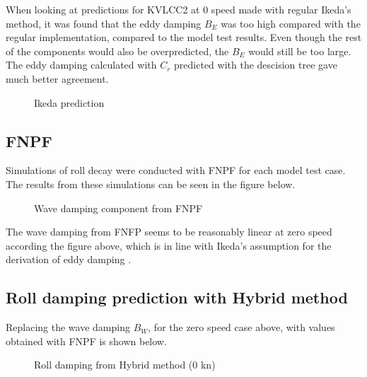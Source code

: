     When looking at predictions for KVLCC2 at 0 speed made with regular
Ikeda's method, it was found that the eddy damping $B_E$ was too high
compared with the regular implementation, compared to the model test
results. Even though the rest of the components would also be
overpredicted, the $B_E$ would still be too large. The eddy damping
calculated with $C_r$ predicted with the descision tree gave much
better agreement.

    \begin{figure}
        \begin{center}\end{center}
        \caption{Ikeda prediction}
        \label{fig:ikeda}
    \end{figure}
    
    \subsection{FNPF}\label{fnpf}

Simulations of roll decay were conducted with FNPF for each model test
case. The results from these simulations can be seen in the figure
below.

    \begin{figure}
        \begin{center}\end{center}
        \caption{Wave damping component from FNPF}
        \label{fig:fnpf}
    \end{figure}
    
    The wave damping from FNFP seems to be reasonably linear at zero speed
according the figure above, which is in line with Ikeda's assumption for
the derivation of eddy damping \cite{7505983/4AFVVGNT}.

    \subsection{Roll damping prediction with Hybrid
method}\label{roll-damping-prediction-with-hybrid-method}
Replacing the wave damping $B_W$, for the zero speed case above, with values obtained with FNPF is shown below. 
    \begin{figure}
        \begin{center}\end{center}
        \caption{Roll damping from Hybrid method (0 kn)}
        \label{fig:hybrid_0}
    \end{figure}
    
